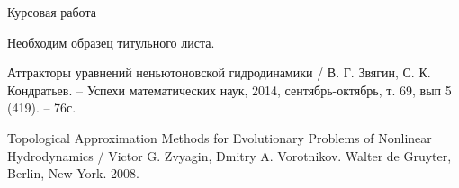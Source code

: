 
\LARGE



Курсовая работа

Необходим образец титульного листа.



\begin{thebibliography}{99}

 Аттракторы уравнений неньютоновской гидродинамики / В. Г. Звягин, С. К. Кондратьев. – Успехи математических наук, 2014, сентябрь-октябрь, т. 69, вып 5 (419). – 76с.

 Topological Approximation Methods for Evolutionary Problems of Nonlinear Hydrodynamics / Victor G. Zvyagin, Dmitry A. Vorotnikov. Walter de Gruyter, Berlin, New York. 2008.

\end{thebibliography}



